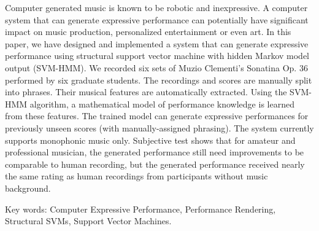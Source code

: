 \begin{abstractEN}

Computer generated music is known to be robotic and inexpressive. A computer system that can generate expressive performance can potentially have significant impact on music production, personalized entertainment or even art. In this paper, we have designed and implemented a system that can generate expressive performance using structural support vector machine with hidden Markov model output (SVM-HMM). We recorded six sets of Muzio Clementi's Sonatina Op. 36 performed by six graduate students. The recordings and scores are manually split into phrases. Their musical features are automatically extracted. Using the SVM-HMM algorithm, a mathematical model of performance knowledge is learned from these features. The trained model can generate expressive performances for previously unseen scores (with manually-assigned phrasing). The system currently supports monophonic music only. Subjective test shows that for amateur and professional musician, the generated performance still need improvements to be comparable to human recording, but the generated performance received nearly the same rating as human recordings from participants without music background. 

Key words: Computer Expressive Performance, Performance Rendering, Structural SVMs, Support Vector Machines.
\end{abstractEN}
